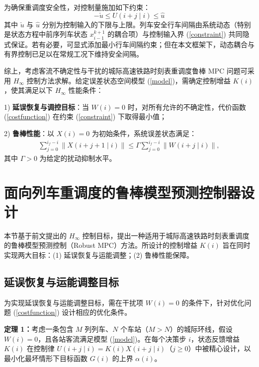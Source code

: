 为确保重调度安全性，对控制量施加如下约束：
\begin{equation}
\label{constraint}
-\check{u} \leq U(i+j \mid i) \leq \hat{u}
\end{equation}
其中 $\check{u}$ 与 $\hat{u}$ 分别为控制输入的下限与上限。列车安全行车间隔由系统动态（特别是状态方程中前序列车状态 $x_{i-1}^{k+1}$ 的耦合项）与控制输入界 (\ref{constraint}) 共同隐式保证。若有必要，可显式添加最小行车间隔约束；但在本文框架下，动态耦合与有界控制已足以在常规工况下维持安全间隔。

综上，考虑客流不确定性与干扰的城际高速铁路时刻表重调度鲁棒 MPC 问题可采用 $H_\infty$ 控制方法求解。给定误差状态空间模型 (\ref{model})，需确定控制增益 $K(i)$，使其满足以下 $H_\infty$ 性能条件：

1) \textbf{延误恢复与调控目标}：当 $W(i) = 0$ 时，对所有允许的不确定性，代价函数 (\ref{costfunction}) 在约束 (\ref{constraint}) 下取得最小值；

2) \textbf{鲁棒性能}：以 $X(i) = 0$ 为初始条件，系统误差状态满足：
\begin{equation}
\begin{aligned}
\sum_{j=0}^{i_{f}-i} \big\| X(i+j+1 \mid i) \big\| \leq
\Gamma \sum_{j=0}^{i_{f}-i} \big\| W(i+j \mid i) \big\|,
\end{aligned}
\end{equation}
其中 $\Gamma > 0$ 为给定的扰动抑制水平。

\section{面向列车重调度的鲁棒模型预测控制器设计}
\label{section3}

本节基于前文提出的 $H_\infty$ 控制目标，提出一种适用于城际高速铁路时刻表重调度的鲁棒模型预测控制（Robust MPC）方法。所设计的控制增益 $K(i)$ 旨在同时实现两大目标：(1) 延误恢复与运能调整；(2) 鲁棒性能保障。

\subsection{延误恢复与运能调整目标}
为实现延误恢复与运能调整目标，需在干扰项 $W(i) = 0$ 的条件下，针对优化问题 (\ref{costfunction}) 设计相应的优化条件。

\textbf{定理 1：}考虑一条包含 $M$ 列列车、$N$ 个车站（$M > N$）的城际环线，假设 $W(i) = 0$，且各站客流满足模型 (\ref{model})。在每个决策步 $i$，状态反馈增益 $K(i)$ 在控制律 $U(i+j \mid i) = K(i) X(i+j \mid i)$（$j \geq 0$）中被精心设计，以最小化最坏情形下目标函数 $G(i)$ 的上界 $\alpha(i)$。

